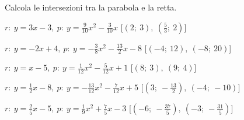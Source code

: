 \begin{esercizio}\label{ese:}
 Calcola le intersezioni tra la parabola e la retta.
 \begin{enumeratea}
  \item  \(r:~y = 3 x -3,~p:~y=\frac{9}{10} x^2 -\frac{3}{10} x \)
   \hfill [\(\left (2;~3 \right ),~\left (\frac{5}{3};~2 \right )\)]
  \item  \(r:~y = -2 x +4,~p:~y=-\frac{3}{8} x^2 -\frac{13}{2} x -8\)
   \hfill [\(\left (-4;~12 \right ),~\left (-8;~20 \right )\)]
  \item  \(r:~y = x -5,~p:~y=\frac{1}{12} x^2 -\frac{5}{12} x +1\)
   \hfill [\(\left (8;~3 \right ),~\left (9;~4 \right )\)]
  \item  \(r:~y = \frac{1}{2} x -8,~p:~y=-\frac{13}{12} x^2 -\frac{7}{12} x +5\)
   \hfill [\(\left (3;~-\frac{13}{2} \right ),~\left (-4;~-10 \right )\)]
  \item  \(r:~y = \frac{2}{5} x -5,~p:~y=\frac{1}{9} x^2 +\frac{7}{5} x -3\)
   \hfill [\(\left (-6;~-\frac{37}{5} \right ),~\left (-3;~-\frac{31}{5} \right )\)]

\end{enumeratea}
\end{esercizio}
